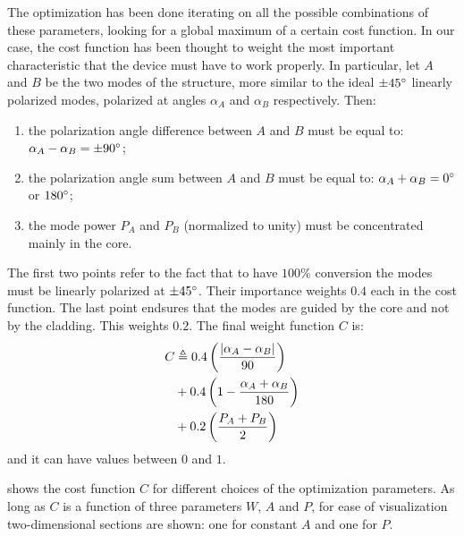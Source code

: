 The optimization has been done iterating on all the possible
combinations of these parameters, looking for a global maximum of a
certain cost function. In our case, the cost function has been thought
to weight the most important characteristic that the device must have
to work properly. In particular, let $A$ and $B$ be the two modes of
the structure, more similar to the ideal $\pm 45^\circ$ linearly
polarized modes, polarized at angles $\alpha_A$ and $\alpha_B$
respectively. Then:
\begin{enumerate}
\item
  the polarization angle difference between $A$ and $B$ must be equal
  to: $\alpha_A - \alpha_B = \pm 90^\circ$;
\item
  the polarization angle sum between $A$ and $B$ must be equal
  to: $\alpha_A + \alpha_B = 0^\circ$ or $180^\circ$;
\item
  the mode power $P_A$ and $P_B$ (normalized to unity) must be
  concentrated mainly in the core.
\end{enumerate}

The first two points refer to the fact that to have $100\%$ conversion
the modes must be linearly polarized at $\pm 45^\circ$. Their
importance weights $0.4$ each in the cost function. The last point
endsures that the modes are guided by the core and not by the
cladding. This weights $0.2$. The final weight function $C$ is:
\begin{equation} \label{eqn:polrot_weight} \begin{split}
  C & \triangleq 0.4 \left( \frac{{\left\lvert\alpha_A - \alpha_B\right\rvert}}{90} \right) \\
    & + 0.4 \left( 1 - \frac{\alpha_A + \alpha_B}{180} \right) \\
    & + 0.2 \left( \frac{P_A + P_B}{2} \right)
\end{split} \end{equation}
and it can have values between $0$ and $1$.

 shows the cost function $C$ for
different choices of the optimization parameters. As long as $C$ is a
function of three parameters $W$, $A$ and $P$, for ease of
visualization two-dimensional sections are shown: one for constant $A$
and one for $P$.

